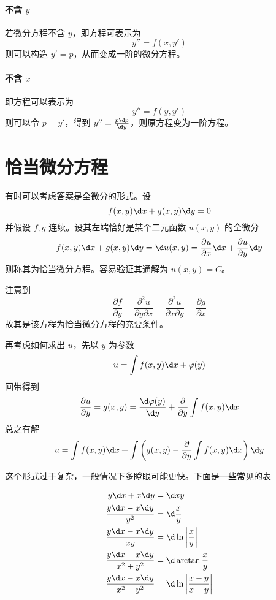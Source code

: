 \paragraph{不含 $y$} 若微分方程不含 $y$，即方程可表示为
\[ y'' = f(x, y') \]
则可以构造 $y'=p$，从而变成一阶的微分方程。

\paragraph{不含 $x$} 即方程可以表示为
\[ y'' = f(y, y') \]
则可以令 $p = y'$，得到 $y'' = \frac{p \d p}{\d y}$，则原方程变为一阶方程。

\section{恰当微分方程}

有时可以考虑答案是全微分的形式。设
\[ f(x, y) \d x + g(x, y) \d y = 0 \]
并假设 $f, g$ 连续。设其左端恰好是某个二元函数 $u(x, y)$ 的全微分
\[ f(x, y) \d x + g(x, y) \d y = \d u(x, y) = \frac{\partial u}{\partial x} \d x + \frac{\partial u}{\partial y} \d y \]
则称其为恰当微分方程。容易验证其通解为 $u(x, y) = C$。

注意到
\[ \frac{\partial f}{\partial y} = \frac{\partial^2 u}{\partial y \partial x} = \frac{\partial^2 u}{\partial x \partial y} = \frac{\partial g}{\partial x} \]
故其是该方程为恰当微分方程的充要条件。

再考虑如何求出 $u$，先以 $y$ 为参数
\[ u = \int f(x, y) \d x + \varphi(y) \]
回带得到
\[ \frac{\partial u}{\partial y} = g(x, y) = \frac{\d \varphi(y)}{\d y} + \frac{\partial}{\partial y}\int f(x, y) \d x \]
总之有解
\[ u = \int f(x, y) \d x + \int \left( g(x, y) - \frac{\partial}{\partial y}\int f(x, y) \d x  \right) \d y \]

这个形式过于复杂，一般情况下多瞪眼可能更快。下面是一些常见的表

\[ \begin{aligned}
		y \d x + x \d y                   & = \d x y                              \\
		\frac{y \d x - x \d y}{y^2}       & = \d \frac{x}{y}                      \\
		\frac{y \d x - x \d y}{xy}        & = \d \ln\left|\frac{x}{y}\right|      \\
		\frac{y \d x - x \d y}{x^2 + y^2} & = \d \arctan \frac{x}{y}              \\
		\frac{y \d x - x \d y}{x^2 - y^2} & = \d \ln\left| \frac{x-y}{x+y}\right| \\
	\end{aligned} \]

